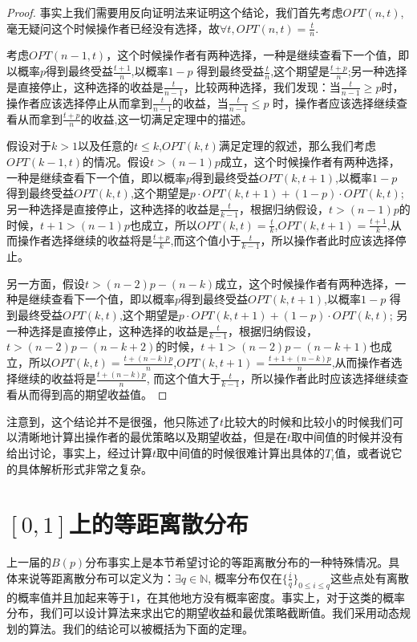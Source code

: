 \documentclass[bachelor]{thuthesis}
\begin{document}
\begin{proof}

事实上我们需要用反向证明法来证明这个结论，我们首先考虑$OPT(n,t)$,毫无疑问这个时候操作者已经没有选择，故$\forall t, OPT(n,t)=\frac{t}{n}$.

考虑$OPT(n-1,t)$，这个时候操作者有两种选择，一种是继续查看下一个值，即以概率$p$得到最终受益$\frac{t+1}{n}$,以概率$1-p$ 得到最终受益$\frac{t}{n}$,这个期望是$\frac{t+p}{n}$;另一种选择是直接停止，这种选择的收益是$\frac{t}{n-1}$，比较两种选择，我们发现：当$\frac{t}{n-1}\ge p$时，操作者应该选择停止从而拿到$\frac{t}{n-1}$的收益，当$\frac{t}{n-1}\le p$ 时，操作者应该选择继续查看从而拿到$\frac{t+p}{n}$的收益,这一切满足定理中的描述。

假设对于$k>1$以及任意的$t\le k$,$OPT(k,t)$满足定理的叙述，那么我们考虑$OPT(k-1,t)$的情况。假设$t>(n-1)p$成立，这个时候操作者有两种选择，一种是继续查看下一个值，即以概率$p$得到最终受益$OPT(k,t+1)$,以概率$1-p$ 得到最终受益$OPT(k,t)$,这个期望是$p\cdot OPT(k,t+1)+(1-p)\cdot OPT(k,t)$; 另一种选择是直接停止，这种选择的收益是$\frac{t}{k-1}$，根据归纳假设，$t>(n-1)p$的时候，$t+1>(n-1)p$也成立，所以$OPT(k,t)=\frac{t}{k}$,$OPT(k,t+1)=\frac{t+1}{k}$,从而操作者选择继续的收益将是$\frac{t+p}{k}$,而这个值小于$\frac{t}{k-1}$，所以操作者此时应该选择停止。

另一方面，假设$t>(n-2)p-(n-k)$成立，这个时候操作者有两种选择，一种是继续查看下一个值，即以概率$p$得到最终受益$OPT(k,t+1)$,以概率$1-p$ 得到最终受益$OPT(k,t)$,这个期望是$p\cdot OPT(k,t+1)+(1-p)\cdot OPT(k,t)$; 另一种选择是直接停止，这种选择的收益是$\frac{t}{k-1}$，根据归纳假设，$t>(n-2)p-(n-k+2)$的时候，$t+1>(n-2)p-(n-k+1)$也成立，所以$OPT(k,t)=\frac{t+(n-k)p}{n}$,$OPT(k,t+1)=\frac{t+1+(n-k)p}{n}$,从而操作者选择继续的收益将是$\frac{t+(n-k)p}{n}$, 而这个值大于$\frac{t}{k-1}$，所以操作者此时应该选择继续查看从而得到高的期望收益值。

\end{proof}

注意到，这个结论并不是很强，他只陈述了$t$比较大的时候和比较小的时候我们可以清晰地计算出操作者的最优策略以及期望收益，但是在$t$取中间值的时候并没有给出讨论，事实上，经过计算$t$取中间值的时候很难计算出具体的$T_i$值，或者说它的具体解析形式非常之复杂。

\section{$[0,1]$上的等距离散分布}

上一届的$B(p)$分布事实上是本节希望讨论的等距离散分布的一种特殊情况。具体来说等距离散分布可以定义为：$\exists q\in \mathbb{N}$, 概率分布仅在$\{\frac{i}{q}\}_{0\le i\le q}$这些点处有离散的概率值并且加起来等于1，在其他地方没有概率密度。事实上，对于这类的概率分布，我们可以设计算法来求出它的期望收益和最优策略截断值。我们采用动态规划的算法。我们的结论可以被概括为下面的定理。
\end{document}
